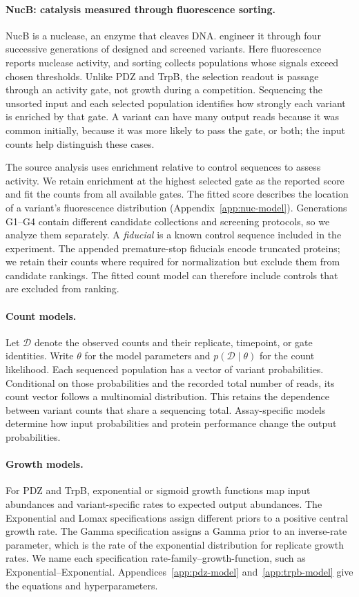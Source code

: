 \documentclass[11pt]{article}
\newcommand{\data}{\mathcal{D}}
\begin{document}
\paragraph{NucB: catalysis measured through fluorescence sorting.}
NucB is a nuclease, an enzyme that cleaves DNA. \citet{thomas2025} engineer
it through four successive generations of designed and screened variants.
Here fluorescence reports nuclease activity, and sorting collects populations
whose signals exceed chosen thresholds. Unlike PDZ and TrpB, the selection
readout is passage through an activity gate, not growth during a competition.
Sequencing the unsorted input and each selected population identifies how
strongly each variant is enriched by that gate. A variant can have many
output reads because it was common initially, because it was more likely
to pass the gate, or both; the input counts help distinguish these cases.

The source analysis uses enrichment relative to control sequences to assess
activity. We retain enrichment at the highest selected gate as the reported
score and fit the counts from all available gates. The fitted score describes
the location of a variant's fluorescence distribution
(Appendix~\ref{app:nuc-model}). Generations G1--G4 contain different candidate
collections and screening protocols, so we analyze them separately.
A \emph{fiducial} is a known control sequence included in the experiment.
The appended premature-stop fiducials encode truncated proteins; we retain
their counts where required for normalization but exclude them from candidate
rankings. The fitted count model can therefore include controls that are
excluded from ranking.

\paragraph{Count models.}
Let $\data$ denote the observed counts and their replicate, timepoint,
or gate identities. Write $\theta$ for the model parameters and
$p(\data\mid\theta)$ for the count likelihood. Each sequenced population
has a vector of variant probabilities. Conditional on those probabilities
and the recorded total number of reads, its count vector follows a
multinomial distribution. This retains the dependence between variant counts
that share a sequencing total. Assay-specific models determine how input
probabilities and protein performance change the output probabilities.

\paragraph{Growth models.}
For PDZ and TrpB, exponential or sigmoid growth functions map input
abundances and variant-specific rates to expected output abundances. The
Exponential and Lomax specifications assign different priors to a positive
central growth rate. The Gamma specification assigns a Gamma prior to an
inverse-rate parameter, which is the rate of the exponential distribution
for replicate growth rates. We name each specification rate-family--growth-function,
such as Exponential--Exponential. Appendices~\ref{app:pdz-model}
and~\ref{app:trpb-model} give the equations and hyperparameters.
\end{document}
